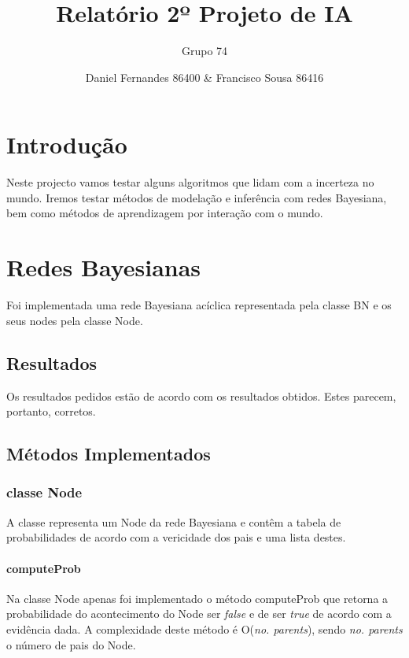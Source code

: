 \documentclass[12pt,a4paper]{article}
\title{Relatório 2º Projeto de IA}
\author{Grupo 74 \and Daniel Fernandes 86400 \& Francisco Sousa 86416}
\begin{document}
\maketitle
\begin{multicols}{2}
	\section{Introdução}
	Neste projecto vamos testar alguns algoritmos que lidam com a incerteza no
	mundo. Iremos testar métodos de modelação e inferência com redes Bayesiana,
	bem como métodos de aprendizagem por interação com o mundo.

	\section{Redes Bayesianas}

	Foi implementada uma rede Bayesiana acíclica representada pela classe BN e os seus nodes pela classe Node.

	\subsection{Resultados}
	Os resultados pedidos estão de acordo com os resultados obtidos. Estes parecem, portanto, corretos. 

	\subsection{Métodos Implementados}
	\subsubsection{classe Node}
	A classe representa um Node da rede Bayesiana e contêm a tabela de probabilidades de acordo com a vericidade dos pais e uma lista destes.
	\paragraph{computeProb}
	Na classe Node apenas foi implementado o método computeProb que retorna a probabilidade do acontecimento do Node ser \textit{false} e de ser \textit{true} de acordo com a evidência dada.
	A complexidade deste método é O(\textit{no. parents}), sendo \textit{no. parents} o número de pais do Node.


\end{multicols}
\end{document}
